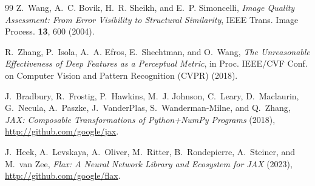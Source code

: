\documentclass[aps,prl,twocolumn,groupedaddress]{revtex4-2}
\begin{document}
\begin{thebibliography}{99}
Z.~Wang, A.~C. Bovik, H.~R. Sheikh, and E.~P. Simoncelli,
\textit{Image Quality Assessment: From Error Visibility to Structural Similarity},
IEEE Trans. Image Process. \textbf{13}, 600 (2004).

R.~Zhang, P.~Isola, A.~A. Efros, E.~Shechtman, and O.~Wang,
\textit{The Unreasonable Effectiveness of Deep Features as a Perceptual Metric},
in Proc. IEEE/CVF Conf. on Computer Vision and Pattern Recognition (CVPR) (2018).

J.~Bradbury, R.~Frostig, P.~Hawkins, M.~J. Johnson, C.~Leary, D.~Maclaurin,
G.~Necula, A.~Paszke, J.~VanderPlas, S.~Wanderman-Milne, and Q.~Zhang,
\textit{JAX: Composable Transformations of Python+NumPy Programs} (2018),
\url{http://github.com/google/jax}.

J.~Heek, A.~Levskaya, A.~Oliver, M.~Ritter, B.~Rondepierre, A.~Steiner, and M.~van Zee,
\textit{Flax: A Neural Network Library and Ecosystem for JAX} (2023),
\url{http://github.com/google/flax}.

\end{thebibliography}
\end{document}
